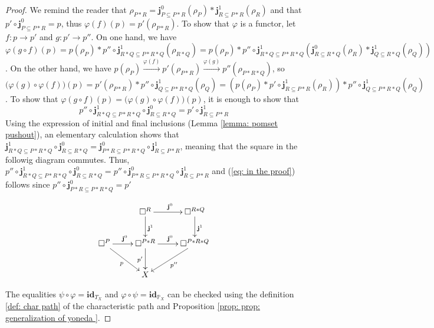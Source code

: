 \documentclass[11pt,a4paper,oldfontcommands]{memoir}
\newcommand*\pobj[1]{\square^{#1}}
\newcommand*\jneda{\mathbf{j}}
\begin{document}
\begin{proof}
    We remind the reader that $\rho_{P*R}=\jneda^0_{P\subseteq P*R} (\rho_P)* \jneda^1_{R\subseteq P*R}(\rho_R)$ and that $ p'\circ \jneda^0_{P\subseteq P*R}=p$, thus $\varphi(f)(p)=p'(\rho_{P*R})$. To show that $\varphi$ is a functor, let $f:p\to p'$ and $g:p'\to p''$. On one hand, we have \linebreak $\varphi(g \circ f)(p)= p(\rho_P)*p''\circ \jneda^1_{R*Q\subseteq P*R*Q}(\rho_{R*Q})=p(\rho_P)*p''\circ \jneda^1_{R*Q\subseteq P*R*Q}(\jneda^0_{R\subseteq R*Q} (\rho_R)* \jneda^1_{Q\subseteq R*Q}(\rho_Q))$. On the other hand, we have $p(\rho_P) \stackrel{\varphi(f)}{\longrightarrow} p'(\rho_{P*R})\stackrel{\varphi(g)}{\longrightarrow} p''(\rho_{P*R*Q})$, so $\bigl(\varphi(g)\circ \varphi(f)\bigl)(p)=p'(\rho_{P*R})*p''\circ \jneda^1_{Q\subseteq P*R*Q}(\rho_Q)=(p(\rho_{P})*p'\circ \jneda^1_{R\subseteq P*R}(\rho_R))*p''\circ \jneda^1_{Q\subseteq P*R*Q}(\rho_Q)$. To show that $\varphi(g \circ f)(p)=\bigl(\varphi(g)\circ \varphi(f)\bigl)(p)$, it is enough to show that 
    \begin{equation}\label{eq: in the proof}
        p''\circ \jneda^1_{R*Q \subseteq P*R*Q} \circ \jneda^0_{R\subseteq R*Q}=p'\circ \jneda^1_{R\subseteq P*R}
    \end{equation}
    Using the expression of initial and final inclusions (Lemma \ref{lemma: pomset pushout}), an elementary calculation shows that $\jneda^1_{R*Q \subseteq P*R*Q} \circ \jneda^0_{R\subseteq R*Q}=\jneda^0_{P*R\subseteq P*R*Q}\circ \jneda^1_{R\subseteq P*R}$, meaning that the square in the followig diagram commutes. Thus, $ p''\circ \jneda^1_{R*Q \subseteq P*R*Q} \circ \jneda^0_{R\subseteq R*Q}= p''\circ \jneda^0_{P*R\subseteq P*R*Q}\circ \jneda^1_{R\subseteq P*R}$ and (\ref{eq: in the proof}) follows since $p''\circ \jneda^0_{P*R \subseteq P*R*Q} =p'$

 $$\xymatrix{
    & \pobj{R} \ar[r]^{\jneda^0} \ar[d]^{\jneda^1}&  {\pobj{R*Q}} \ar[d]^{\jneda^1}  \\ \pobj{P} \ar[dr]_{p} \ar[r]^{\jneda^0} &  {\pobj{P*R}} \ar[r]^{\jneda^0} \ar[d]_{p'} &  \pobj{P*R*Q}  \ar[dl]^{p''}  \\   & X &    }
$$

The equalities $\psi \circ \varphi = \mathbf{id}_{T_X}$ and $ \varphi \circ \psi = \mathbf{id}_{\mathbb{P}_{X}}$ can be checked using the definition \ref{def: char path} of the characteristic path and Proposition \ref{prop: prop: generalization of yoneda }. 
  
\end{proof}
\end{document}
